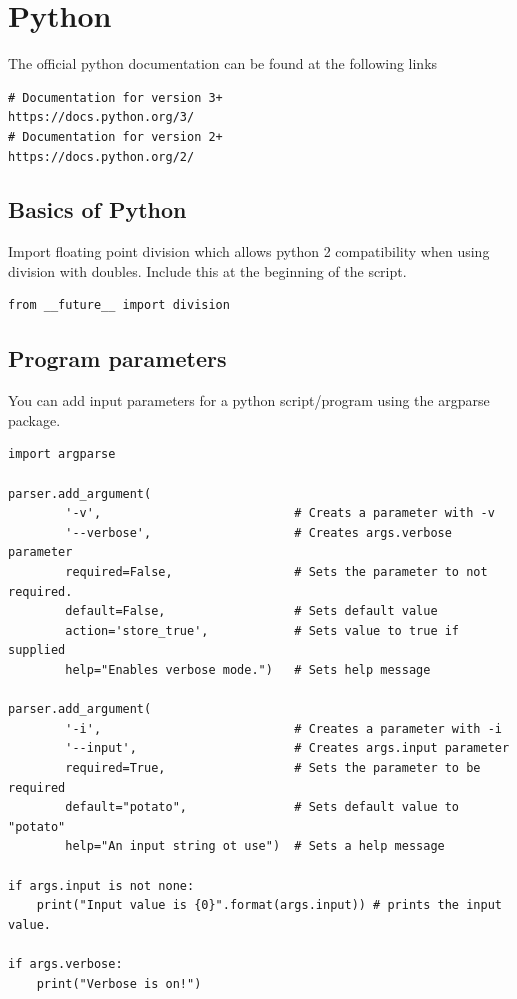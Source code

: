 \chapter{Python}
\thispagestyle{fancy}
\lstset{language=Python}

The official python documentation can be found at the following links
\begin{lstlisting}
# Documentation for version 3+
https://docs.python.org/3/
# Documentation for version 2+
https://docs.python.org/2/
\end{lstlisting}

\section{Basics of Python}

Import floating point division which allows python 2 compatibility when using division with doubles. Include this at the beginning of the script.
\begin{lstlisting}
from __future__ import division
\end{lstlisting}



\section{Program parameters}

You can add input parameters for a python script/program using the argparse package.
\begin{lstlisting}
import argparse

parser.add_argument(
		'-v',							# Creats a parameter with -v
		'--verbose',					# Creates args.verbose parameter
		required=False,					# Sets the parameter to not required.
		default=False,					# Sets default value
		action='store_true',			# Sets value to true if supplied
		help="Enables verbose mode.")	# Sets help message
					
parser.add_argument(
		'-i',							# Creates a parameter with -i
		'--input',						# Creates args.input parameter
		required=True,					# Sets the parameter to be required
		default="potato",				# Sets default value to "potato"
		help="An input string ot use")	# Sets a help message
		
if args.input is not none:
	print("Input value is {0}".format(args.input)) # prints the input value.
	
if args.verbose:
	print("Verbose is on!")
\end{lstlisting}





